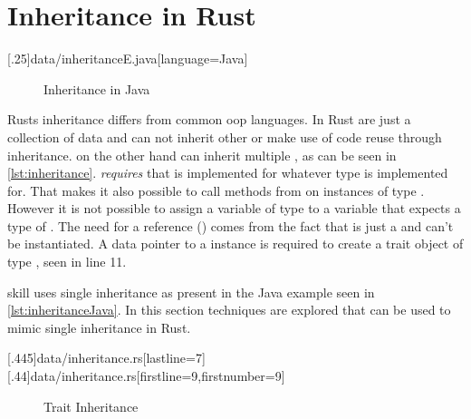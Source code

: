\documentclass[thesis]{subfiles}
\begin{document}
\section{Inheritance in Rust}\label{sec:inheritance}
  \LstTikzBox{\inheritanceJava}[.25\linewidth]{data/inheritanceE.java}[language=Java]
  \begin{wrapfigure}{r}{0.38\textwidth}
    \vspace*{-1.825\baselineskip}%
    \captionsetup{type=lstlisting}
    \begin{center}
      \usebox{\inheritanceJava}
    \end{center}
    \vspace*{-\baselineskip}%
    \caption{Inheritance in Java}\label{lst:inheritanceJava}%
    \vspace*{-\baselineskip}%
  \end{wrapfigure}
  Rusts inheritance differs from common \gls{oop} languages.
  In Rust \structs are just a collection of data and can not inherit other \structs or make use of code reuse through inheritance.
  \traits  on the other hand can inherit multiple \traits, as can be seen in \autoref{lst:inheritance}.
   \emph{requires} that  is implemented for whatever type  is implemented for.
  That makes it also possible to call methods from  on instances of type .
  However it is not possible to assign a variable of type  to a variable that expects a type of .
  The need for a reference (\codr{&}) comes from the fact that  is just a \trait and can't be instantiated.
  A data pointer to a \struct instance is required to create a trait object of type , seen in line 11.

  \gls{skill} uses single inheritance\autocite{skill-tr} as present in the Java example seen in \autoref{lst:inheritanceJava}.
  In this section techniques are explored that can be used to mimic single inheritance in Rust.

  \LstTikzBox{\inheritanceOne}[.445\linewidth]{data/inheritance.rs}[lastline=7]
  \LstTikzBox{\inheritanceTwo}[.44\linewidth]{data/inheritance.rs}[firstline=9,firstnumber=9]
  \begin{figure}[ht]
    \captionsetup{type=lstlisting}
    \usebox{\inheritanceOne}\hfill
    \usebox{\inheritanceTwo}
    \caption{Trait Inheritance}\label{lst:inheritance}
  \end{figure}
\end{document}
